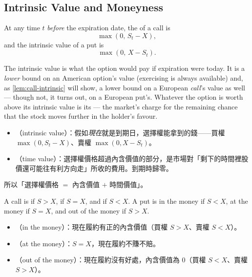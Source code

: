 \subsection{Intrinsic Value and Moneyness}


\begin{definition}
	At any time $t$ \emph{before} the expiration date, the  of a call is
	\[
		\max(0,\, S_{t}-X) ,
	\]
	and the intrinsic value of a put is
	\[
		\max(0,\, X-S_{t}) .
	\]
\end{definition}

\suppstart
The intrinsic value is what the option would pay if expiration were today.
It is a \emph{lower} bound on an American option's value (exercising is always available) and, as \autoref{lem:call-intrinsic} will show, a lower bound on a European \emph{call}'s value as well --- though not, it turns out, on a European put's.
Whatever the option is worth above its intrinsic value is its  --- the market's charge for the remaining chance that the stock moves further in the holder's favour.

\begin{remark}
	\begin{itemize}[nosep]
		\item {}（intrinsic value）：假如\emph{現在}就是到期日，選擇權能拿到的錢——買權 $\max(0,S_{t}-X)$、賣權 $\max(0,X-S_{t})$。
		\item {}（time value）：選擇權價格超過內含價值的部分，是市場對「剩下的時間裡股價還可能往有利方向走」所收的費用。到期時歸零。
	\end{itemize}
	所以「選擇權價格 $=$ 內含價值 $+$ 時間價值」。
\end{remark}
\suppend

\begin{definition}
	A call is  if $S>X$,  if $S=X$, and  if $S<X$.
	A put is in the money if $S<X$, at the money if $S=X$, and out of the money if $S>X$.
\end{definition}

\suppstart
\begin{remark}
	\begin{itemize}[nosep]
		\item {}（in the money）：現在履約有正的內含價值（買權 $S>X$、賣權 $S<X$）。
		\item {}（at the money）：$S=X$，現在履約不賺不賠。
		\item {}（out of the money）：現在履約沒有好處，內含價值為 $0$（買權 $S<X$、賣權 $S>X$）。
	\end{itemize}
\end{remark}

